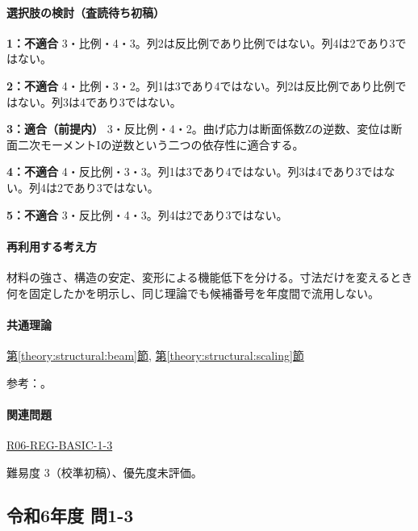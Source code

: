 \paragraph{選択肢の検討（査読待ち初稿）}\mbox{}\par

\noindent\textbf{1：不適合} 3・比例・4・3。列2は反比例であり比例ではない。列4は2であり3ではない。\par

\noindent\textbf{2：不適合} 4・比例・3・2。列1は3であり4ではない。列2は反比例であり比例ではない。列3は4であり3ではない。\par

\noindent\textbf{3：適合（前提内）} 3・反比例・4・2。曲げ応力は断面係数Zの逆数、変位は断面二次モーメントIの逆数という二つの依存性に適合する。\par

\noindent\textbf{4：不適合} 4・反比例・3・3。列1は3であり4ではない。列3は4であり3ではない。列4は2であり3ではない。\par

\noindent\textbf{5：不適合} 3・反比例・4・3。列4は2であり3ではない。\par

\paragraph{再利用する考え方} 材料の強さ、構造の安定、変形による機能低下を分ける。寸法だけを変えるとき何を固定したかを明示し、同じ理論でも候補番号を年度間で流用しない。

\paragraph{共通理論} \hyperref[theory:structural:beam]{第\ref*{theory:structural:beam}節}, \hyperref[theory:structural:scaling]{第\ref*{theory:structural:scaling}節}

\par 参考：\cite{struct_mit_beam,struct_mit_buckling,struct_mlit_limit}。

\paragraph{関連問題} \hyperref[q:r06-reg-basic-1-3]{R06-REG-BASIC-1-3}

\par 難易度 3（校準初稿）、優先度未評価。

\subsection{令和6年度 問1-3}
\label{q:r06-reg-basic-1-3}

